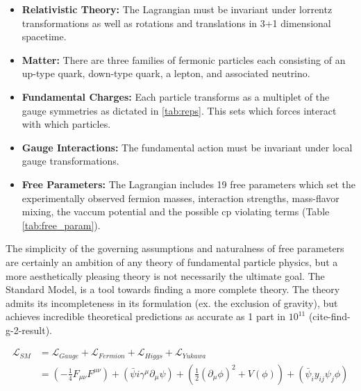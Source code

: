 \begin{itemize}
\item \textbf{Relativistic Theory:} The Lagrangian must be invariant under lorrentz transformations as well as rotations and translations
in 3+1 dimensional spacetime. 
\item \textbf{Matter:} There are three families of fermonic particles each consisting of an up-type quark, 
down-type quark, a lepton, and associated neutrino.
\item \textbf{Fundamental Charges:} Each particle transforms as a multiplet of the gauge symmetries as dictated in \ref{tab:reps}. This sets which forces interact with which particles. 
\item \textbf{Gauge Interactions:} The fundamental action must be invariant under local gauge transformations.
\item \textbf{Free Parameters:} The Lagrangian includes 19 free parameters which set the experimentally observed fermion masses, 
interaction strengths, mass-flavor mixing, the vaccum potential and the possible cp violating terms (Table \ref{tab:free_param}). 
\end{itemize}  

The simplicity of the governing assumptions and naturalness of free parameters are certainly an ambition of any theory of fundamental
particle physics, but a more aesthetically pleasing theory is not necessarily the ultimate goal. The Standard
Model, is  a tool towards finding a more complete theory. The theory admits its incompleteness in its formulation (ex. the exclusion of gravity), but achieves incredible theoretical predictions as accurate as 1 part in $10^{11}$ (cite-find-g-2-result). 

\begin{align*}
\mathcal{L}_{SM} &= \mathcal{L}_{Gauge} + \mathcal{L}_{Fermion} + \mathcal{L}_{Higgs} + \mathcal{L}_{Yukawa}\\
&=\left(-\frac{1}{4} F_{\mu\nu}F^{\mu\nu} \right )
  + \left (\bar\psi i\gamma^\mu \partial_\mu \psi \right) +
 \left(\frac{1}{2}(\partial_\mu \phi)^2 + V(\phi) \right) + \left(\bar \psi_i y_{ij} \psi_j \phi \right ) 
\end{align*}

